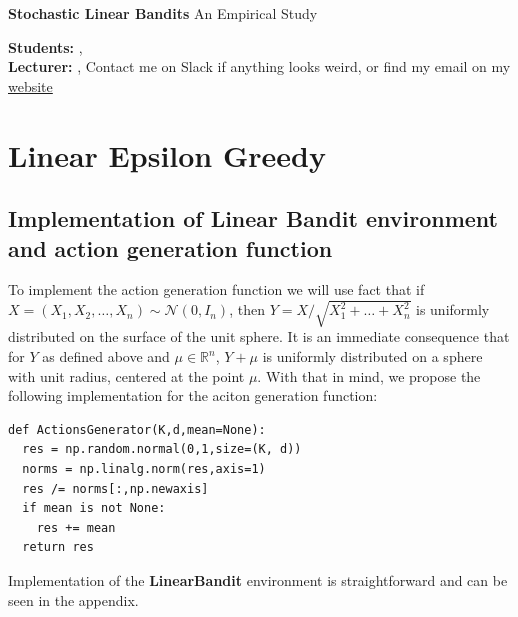 





\begin{Large}
    \textsf{\textbf{Stochastic Linear Bandits}}
    An Empirical Study
\end{Large}

\vspace{1ex}

\textsf{\textbf{Students:}} , \\
\textsf{\textbf{Lecturer:}} , Contact me on Slack if anything looks weird, or find my email on my \href{www.cvernade.com}{website} 


\vspace{2ex}

\section{Linear Epsilon Greedy}
\subsection{Implementation of Linear Bandit environment and action generation function}
To implement the action generation function we will use fact that if $ X = (X_1, X_2, \ldots, X_n) \sim \mathcal{N}(0, I_n) $, 
then $ Y = X / \sqrt{X_1^2 + \ldots + X_n^2} $ is uniformly distributed on the surface of the unit sphere. It is an immediate
consequence that for $Y$ as defined above and $\mu \in \mathbb{R}^n$, $ Y + \mu$ is uniformly distributed on a sphere with unit radius,
centered at the point $\mu$. With that in mind, we propose the following implementation for the aciton generation function:
\begin{verbatim}
def ActionsGenerator(K,d,mean=None):
  res = np.random.normal(0,1,size=(K, d))
  norms = np.linalg.norm(res,axis=1)
  res /= norms[:,np.newaxis]
  if mean is not None:
    res += mean
  return res
\end{verbatim}
Implementation of the \textbf{LinearBandit} environment is straightforward and can be seen in the appendix.
